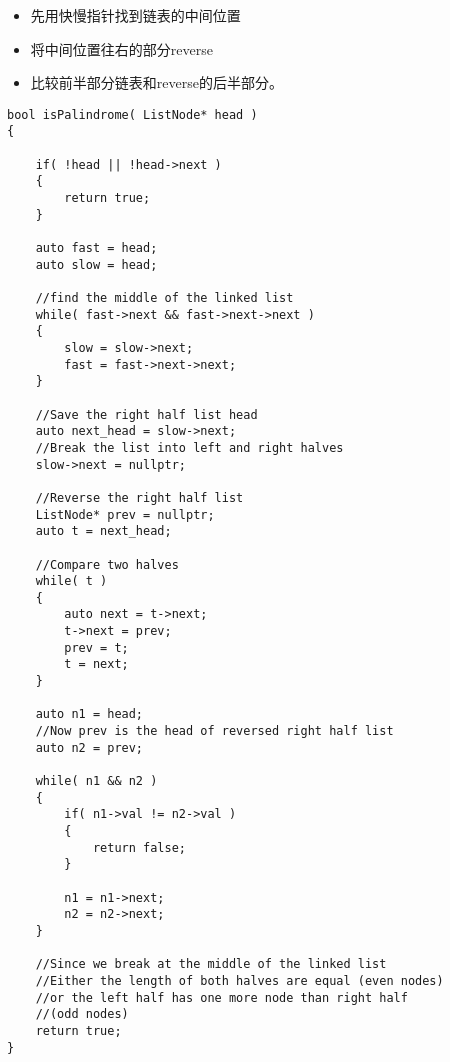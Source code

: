 \begin{itemize}
\item 先用快慢指针找到链表的中间位置
\item 将中间位置往右的部分reverse
\item 比较前半部分链表和reverse的后半部分。
\end{itemize}


\setcounter{lstlisting}{0}
\begin{lstlisting}[style=customc, caption={Find Middle Reverse Right Half}]
bool isPalindrome( ListNode* head )
{

    if( !head || !head->next )
    {
        return true;
    }

    auto fast = head;
    auto slow = head;

    //find the middle of the linked list
    while( fast->next && fast->next->next )
    {
        slow = slow->next;
        fast = fast->next->next;
    }

    //Save the right half list head
    auto next_head = slow->next;
    //Break the list into left and right halves
    slow->next = nullptr;

    //Reverse the right half list
    ListNode* prev = nullptr;
    auto t = next_head;

    //Compare two halves
    while( t )
    {
        auto next = t->next;
        t->next = prev;
        prev = t;
        t = next;
    }

    auto n1 = head;
    //Now prev is the head of reversed right half list
    auto n2 = prev;

    while( n1 && n2 )
    {
        if( n1->val != n2->val )
        {
            return false;
        }

        n1 = n1->next;
        n2 = n2->next;
    }

    //Since we break at the middle of the linked list
    //Either the length of both halves are equal (even nodes)
    //or the left half has one more node than right half
    //(odd nodes)
    return true;
}
\end{lstlisting}